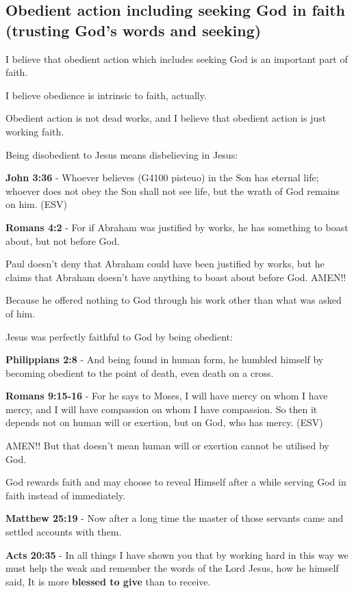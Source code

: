 \documentclass[11pt]{article}
\begin{document}
\subsection{Obedient action including seeking God in faith (trusting God's words and seeking)}
\label{sec:orgc04ef92}
I believe that obedient action which includes seeking God is an important part of faith.

I believe obedience is intrinsic to faith, actually.

Obedient action is not dead works, and I believe that obedient action is just working faith.

Being disobedient to Jesus means disbelieving in Jesus:

\textbf{John 3:36} - Whoever believes (G4100 pisteuo) in the Son has eternal life; whoever does not obey the Son shall not see life, but the wrath of God remains on him. (ESV)

\textbf{Romans 4:2} - For if Abraham was justified by works, he has something to boast about, but not before God.

Paul doesn't deny that Abraham could have been
justified by works, but he claims that Abraham
doesn't have anything to boast about before
God. AMEN!!

Because he offered nothing to God through his work other than what was asked of him.

Jesus was perfectly faithful to God by being obedient:

\textbf{Philippians 2:8} - And being found in human form, he humbled himself by becoming obedient to the point of death, even death on a cross.

\textbf{Romans 9:15-16} - For he says to Moses, I will have mercy on whom I have mercy, and I will have compassion on whom I have compassion. So then it depends not on human will or exertion, but on God, who has mercy. (ESV)

AMEN!! But that doesn't mean human will or exertion cannot be utilised by God.

God rewards faith and may choose to reveal Himself after a while serving God in faith instead of immediately.

\textbf{Matthew 25:19} - Now after a long time the master of those servants came and settled accounts with them.

\textbf{Acts 20:35} - In all things I have shown you that by working hard in this way we must help the weak and remember the words of the Lord Jesus, how he himself said, It is more \textbf{blessed to give} than to receive.
\end{document}
